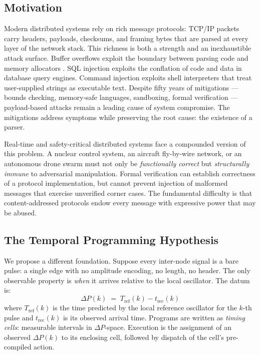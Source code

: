 \documentclass[twocolumn,10pt]{article}
\newcommand{\DP}{\Delta P}          %
\newcommand{\Tref}{T_{\mathrm{ref}}}
\newcommand{\trec}{t_{\mathrm{rec}}}
\begin{document}
\subsection{Motivation}

Modern distributed systems rely on rich message protocols: TCP/IP
packets carry headers, payloads, checksums, and framing bytes that are
parsed at every layer of the network stack. This richness is both a
strength and an inexhaustible attack surface. Buffer overflows exploit
the boundary between parsing code and memory allocators
\cite{saltzer1975protection}. SQL injection exploits the conflation of
code and data in database query engines. Command injection exploits
shell interpreters that treat user-supplied strings as executable text.
Despite fifty years of mitigations --- bounds checking, memory-safe
languages, sandboxing, formal verification --- payload-based attacks
remain a leading cause of system compromise. The mitigations address
symptoms while preserving the root cause: the existence of a parser.

Real-time and safety-critical distributed systems face a compounded
version of this problem. A nuclear control system, an aircraft fly-by-wire
network, or an autonomous drone swarm must not only be
\emph{functionally correct} but \emph{structurally immune} to adversarial
manipulation. Formal verification can establish correctness of a
protocol implementation, but cannot prevent injection of malformed
messages that exercise unverified corner cases. The fundamental
difficulty is that content-addressed protocols endow every message with
expressive power that may be abused.

\subsection{The Temporal Programming Hypothesis}

We propose a different foundation. Suppose every inter-node signal
is a bare pulse: a single edge with no amplitude encoding, no length,
no header. The only observable property is \emph{when} it arrives
relative to the local oscillator. The datum is:
\begin{equation}
  \DP(k) \;=\; \Tref(k) - \trec(k)
  \label{eq:dp-def}
\end{equation}
where $\Tref(k)$ is the time predicted by the local reference oscillator
for the $k$-th pulse and $\trec(k)$ is its observed arrival time.
Programs are written as \emph{timing cells}: measurable intervals in
$\DP$-space. Execution is the assignment of an observed $\DP(k)$ to its
enclosing cell, followed by dispatch of the cell's pre-compiled action.
\end{document}
